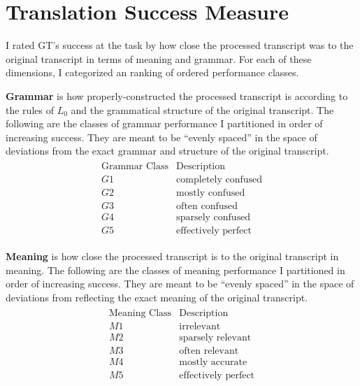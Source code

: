 \documentclass{article}
\begin{document}
\section{Translation Success Measure}


I rated GT's success at the task by how close the processed transcript was to the original transcript in terms of meaning and grammar. For each of these dimensions, I categorized an ranking of ordered performance classes.




\textbf{Grammar} is how properly-constructed the processed transcript is according to the rules of $L_0$ and the grammatical structure of the original transcript.
The following are the classes of grammar performance I partitioned in order of increasing success.
They are meant to be ``evenly spaced'' in the space of deviations from the exact grammar and structure of the original transcript.
\begin{align*} \begin{array}{r|l}
\text{Grammar Class} & \text{Description} \\ \hline
G1 & \text{completely confused} \\
G2 & \text{mostly confused} \\
G3 & \text{often confused} \\
G4 & \text{sparsely confused} \\
G5 & \text{effectively perfect}
\end{array} \end{align*}




\textbf{Meaning} is how close the processed transcript is to the original transcript in meaning.
The following are the classes of meaning performance I partitioned in order of increasing success.
They are meant to be ``evenly spaced'' in the space of deviations from reflecting the exact meaning of the original transcript.
\begin{align*} \begin{array}{r|l}
\text{Meaning Class} & \text{Description} \\ \hline
  M1 & \text{irrelevant} \\
  M2 & \text{sparsely relevant} \\
  M3 & \text{often relevant} \\
  M4 & \text{mostly accurate} \\
  M5 & \text{effectively perfect} \\
\end{array} \end{align*}
\end{document}
